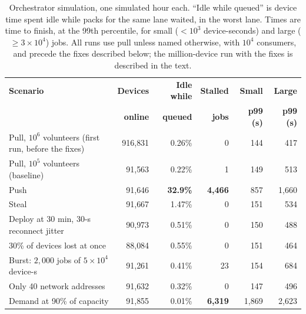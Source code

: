 \documentclass[11pt,a4paper]{article}
\theoremstyle{definition}
\theoremstyle{plain}
\begin{document}
\begin{table}[ht]
\centering
\caption{Orchestrator simulation, one simulated hour each. ``Idle while queued'' is device time spent
idle while packs for the same lane waited, in the worst lane. Times are time to finish, at the 99th
percentile, for small ($<10^3$ device-seconds) and large ($\ge 3\times10^4$) jobs. All runs use pull
unless named otherwise, with $10^4$ consumers, and precede the fixes described below; the million-device run with
the fixes is described in the text.}\label{tab:orchsim}
\footnotesize
\begin{tabularx}{\linewidth}{@{}Xrrrrr@{}}
\toprule
\textbf{Scenario} & \textbf{Devices} & \textbf{Idle while} & \textbf{Stalled} & \textbf{Small} & \textbf{Large} \\
 & \textbf{online} & \textbf{queued} & \textbf{jobs} & \textbf{p99 (s)} & \textbf{p99 (s)} \\
\midrule
Pull, $10^6$ volunteers (first run, before the fixes) & 916{,}831 & 0.26\% & 0 & 144 & 417 \\
\midrule
Pull, $10^5$ volunteers (baseline) & 91{,}563 & 0.22\% & 1 & 149 & 513 \\
Push & 91{,}646 & \textbf{32.9\%} & \textbf{4{,}466} & 857 & 1{,}660 \\
Steal & 91{,}667 & 1.47\% & 0 & 151 & 534 \\
Deploy at 30 min, 30-s reconnect jitter & 90{,}973 & 0.51\% & 0 & 150 & 488 \\
30\% of devices lost at once & 88{,}084 & 0.55\% & 0 & 151 & 464 \\
Burst: $2{,}000$ jobs of $5\times10^4$ device-s & 91{,}261 & 0.41\% & 23 & 154 & 684 \\
Only 40 network addresses & 91{,}632 & 0.32\% & 0 & 147 & 496 \\
Demand at 90\% of capacity & 91{,}855 & 0.01\% & \textbf{6{,}319} & 1{,}869 & 2{,}623 \\
\bottomrule
\end{tabularx}
\end{table}
\end{document}
